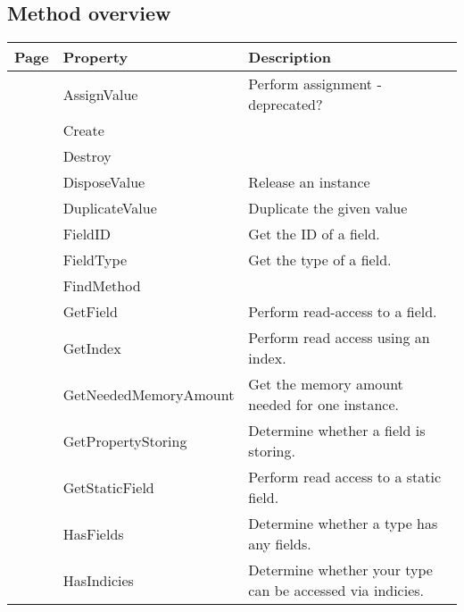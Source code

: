 \subsection{Method overview}
\label{thoriumcorepkg:thorium:tthoriumhostobjecttype:methods}
\begin{tabularx}{\textwidth}{llX}
Page & Property & Description  \\ \hline
\pageref{thoriumcorepkg:thorium:tthoriumhostobjecttype:assignvalue} & AssignValue  & Perform assignment - deprecated? \\
\pageref{thoriumcorepkg:thorium:tthoriumhostobjecttype:create} & Create  &  \\
\pageref{thoriumcorepkg:thorium:tthoriumhostobjecttype:destroy} & Destroy  &  \\
\pageref{thoriumcorepkg:thorium:tthoriumhostobjecttype:disposevalue} & DisposeValue  & Release an instance \\
\pageref{thoriumcorepkg:thorium:tthoriumhostobjecttype:duplicatevalue} & DuplicateValue  & Duplicate the given value \\
\pageref{thoriumcorepkg:thorium:tthoriumhostobjecttype:fieldid} & FieldID  & Get the ID of a field. \\
\pageref{thoriumcorepkg:thorium:tthoriumhostobjecttype:fieldtype} & FieldType  & Get the type of a field. \\
\pageref{thoriumcorepkg:thorium:tthoriumhostobjecttype:findmethod} & FindMethod  &  \\
\pageref{thoriumcorepkg:thorium:tthoriumhostobjecttype:getfield} & GetField  & Perform read-access to a field. \\
\pageref{thoriumcorepkg:thorium:tthoriumhostobjecttype:getindex} & GetIndex  & Perform read access using an index. \\
\pageref{thoriumcorepkg:thorium:tthoriumhostobjecttype:getneededmemoryamount} & GetNeededMemoryAmount  & Get the memory amount needed for one instance. \\
\pageref{thoriumcorepkg:thorium:tthoriumhostobjecttype:getpropertystoring} & GetPropertyStoring  & Determine whether a field is storing. \\
\pageref{thoriumcorepkg:thorium:tthoriumhostobjecttype:getstaticfield} & GetStaticField  & Perform read access to a static field. \\
\pageref{thoriumcorepkg:thorium:tthoriumhostobjecttype:hasfields} & HasFields  & Determine whether a type has any fields. \\
\pageref{thoriumcorepkg:thorium:tthoriumhostobjecttype:hasindicies} & HasIndicies  & Determine whether your type can be accessed via indicies. \\

\end{tabularx}
